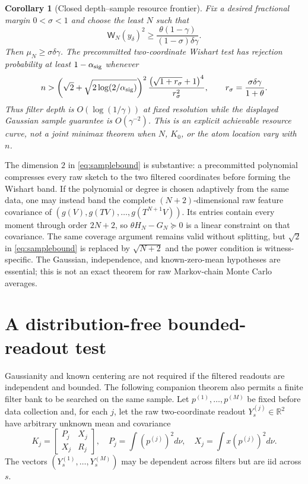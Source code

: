 \documentclass[11pt]{article}
\newtheorem{corollary}[theorem]{Corollary}
\theoremstyle{definition}
\theoremstyle{remark}
\begin{document}
\begin{corollary}[Closed depth--sample resource frontier]
\label{cor:resources}
Fix a desired fractional margin $0<\sigma<1$ and choose the least $N$ such
that
\begin{equation}
 \mathsf W_N(y_\delta)^2\geq
 \frac{\theta(1-\gamma)}{(1-\sigma)\delta\gamma}.       \label{eq:depthslack}
\end{equation}
Then $\mu_N\geq\sigma\delta\gamma$.  The precommitted two-coordinate
Wishart test has rejection probability at least $1-\alpha_{\rm sig}$ whenever
\begin{equation}
 n>
 \left(\sqrt2+\sqrt{2\log(2/\alpha_{\rm sig})}\right)^2
 \frac{\bigl(\sqrt{1+r_\sigma}+1\bigr)^4}{r_\sigma^2},
 \qquad r_\sigma=\frac{\sigma\delta\gamma}{1+\theta}. \label{eq:jointfrontier}
\end{equation}
Thus filter depth is $O(\log(1/\gamma))$ at fixed resolution while the displayed
Gaussian sample guarantee is $O(\gamma^{-2})$.  This is an explicit achievable
resource curve, not a joint minimax theorem when $N$, $K_0$, or the atom
location vary with $n$.
\end{corollary}

The dimension $2$ in \eqref{eq:samplebound} is substantive: a precommitted
polynomial compresses every raw sketch to the two filtered coordinates before
forming the Wishart band.  If the polynomial or degree is chosen adaptively
from the same data, one may instead band the complete $(N+2)$-dimensional raw
feature covariance of $(g(V),g(TV),\ldots,g(T^{N+1}V))$.  Its entries contain
every moment through order $2N+2$, so $\theta H_N-G_N\succeq0$ is a linear
constraint on that covariance.  The same coverage argument remains valid
without splitting, but $\sqrt2$ in \eqref{eq:samplebound} is replaced by
$\sqrt{N+2}$ and the power condition is witness-specific.  The Gaussian,
independence, and known-zero-mean hypotheses are essential; this is not an
exact theorem for raw Markov-chain Monte Carlo averages.

\section{A distribution-free bounded-readout test}
\label{sec:bounded}

Gaussianity and known centering are not required if the filtered readouts are
independent and bounded.  The following companion theorem also permits a finite
filter bank to be searched on the same sample.  Let
$p^{(1)},\ldots,p^{(M)}$ be fixed before data collection and, for each $j$, let
the raw two-coordinate readout $Y_s^{(j)}\in\mathbb R^2$ have arbitrary unknown
mean and covariance
\begin{equation}
 K_j=\begin{bmatrix}P_j&X_j\\X_j&R_j\end{bmatrix},
 \quad
 P_j=\int(p^{(j)})^2d\nu,\quad
 X_j=\int x(p^{(j)})^2d\nu.                           \label{eq:boundedK}
\end{equation}
The vectors $(Y_s^{(1)},\ldots,Y_s^{(M)})$ may be dependent across filters but
are iid across $s$.
\end{document}
